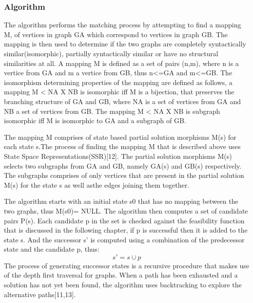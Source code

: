 \subsubsection{Algorithm}
The algorithm performs the matching process by attempting to find a mapping M, of vertices in graph G{\tiny A} which correspond to vertices in graph G{\tiny B}. The mapping is then used to determine if the two graphs are completely syntactically similar(isomorphic), partially syntactically similar or have no structural similarities at all.
A mapping M is defined as a set of pairs (n,m), where n is a vertice from G{\tiny A} and m a vertice from G{\tiny B}, thus n<=G{\tiny A} and m<=G{\tiny B}.
The isomorphism determining properties of the mapping are defined as follows, a mapping M < NA X NB is isomorphic iff M is a bijection, that preserves the branching structure of G{\tiny A} and G{\tiny B}, where NA is a set of vertices from G{\tiny A} and NB a set of vertices from G{\tiny B}.\newline\newline
The mapping M < NA X NB is subgraph isomorphic iff M is isomorphic to G{\tiny A} and a subgraph of G{\tiny B}.

The mapping M comprises of state based partial solution morphisms M(s) for each state s.The process of finding the mapping M that is described above uses State Space Representations(SSR)[12].
The partial solution morphisms M(s) selects two subgraphs from G{\tiny A} and G{\tiny B}, namely G{\tiny A}(s) and G{\tiny B}(s) respectively. The subgraphs comprises of only vertices that are present in the partial solution M(s) for the state s as well asthe edges joining them together.\newline\newline

The algorithm starts with an initial state s0 that has no mapping between the two graphs, thus M(s0)= NULL. The algorithm then computes a set of candidate pairs P(s). Each candidate p in the set is checked against the feasibility function that is discussed in the following chapter, if p is successful then it is added to the state s. And
the successor s' is computed using a combination of the predecessor state and the candidate p, thus:
	\begin{equation}
		s' = s \cup p
	\end{equation} 
The process of generating successor states is a recursive procedure that makes use of the depth first traversal for graphs. When a path has been 
exhausted and a solution has not yet been found, the algorithm uses backtracking to explore the alternative paths[11,13].

